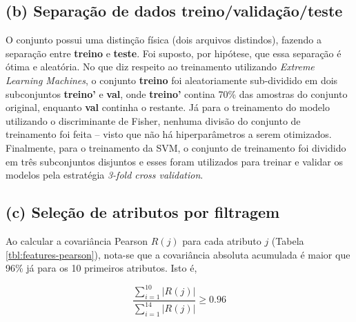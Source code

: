 \documentclass[12pt]{report}
\begin{document}
\subsection{(b) Separação de dados treino/validação/teste}
O conjunto possui uma distinção física (dois arquivos distindos), fazendo a separação entre \textbf{treino} e \textbf{teste}. Foi suposto, por hipótese, que essa separação é ótima e aleatória. No que diz respeito ao treinamento utilizando \textit{Extreme Learning Machines}, o conjunto \textbf{treino} foi aleatoriamente sub-dividido em dois subconjuntos \textbf{treino'} e \textbf{val}, onde \textbf{treino'} contina 70\% das amostras do conjunto original, enquanto \textbf{val} continha o restante.
Já para o treinamento do modelo utilizando o discriminante de Fisher, nenhuma divisão do conjunto de treinamento foi feita -- visto que não há hiperparâmetros a serem otimizados.
Finalmente, para o treinamento da SVM, o conjunto de treinamento foi dividido em três subconjuntos disjuntos e esses foram utilizados para treinar e validar os modelos pela estratégia \textit{3-fold cross validation}.
		

\subsection{(c) Seleção de atributos por filtragem}
		
Ao calcular a covariância Pearson $R(j)$ para cada atributo $j$ (Tabela \ref{tbl:features-pearson}), nota-se que a covariância absoluta acumulada é maior que 96\% já para os 10 primeiros atributos. Isto é,
		
$$\frac{\sum_{i=1}^{10} |R(j)|}{\sum_{i=1}^{14} |R(j)|} \ge 0.96$$
		
\end{document}

